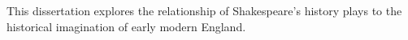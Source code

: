 \noindent
This dissertation explores the relationship of Shakespeare's history plays to the historical imagination of early modern England.